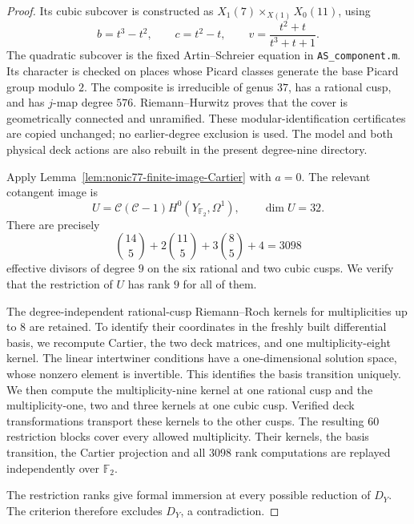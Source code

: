 \begin{proof}
Its cubic subcover is constructed as
$X_1(7)\times_{X(1)}X_0(11)$, using
\[
 b=t^3-t^2,\qquad c=t^2-t,\qquad
 v=\frac{t^2+t}{t^3+t+1}.
\]
The quadratic subcover is the fixed Artin--Schreier equation in
\texttt{AS\_component.m}. Its character is checked on places whose
Picard classes generate the base Picard group modulo $2$.
The composite is irreducible of genus $37$, has a rational cusp,
and has $j$-map degree $576$. Riemann--Hurwitz proves that the
cover is geometrically connected and unramified.
These modular-identification certificates are copied unchanged;
no earlier-degree exclusion is used. The model and both physical
deck actions are also rebuilt in the present degree-nine directory.

Apply Lemma~\ref{lem:nonic77-finite-image-Cartier} with $a=0$.
The relevant cotangent image is
\[
 U=\mathcal C(\mathcal C-1)H^0(Y_{\mathbb F_2},\Omega^1),
 \qquad \dim U=32.
\]
There are precisely
\[
 \binom{14}{5}+2\binom{11}{5}+3\binom85+4=3098
\]
effective divisors of degree $9$ on the six rational and two cubic
cusps. We verify that the restriction of $U$ has rank $9$ for all
of them.

The degree-independent rational-cusp Riemann--Roch kernels for
multiplicities up to $8$ are retained. To identify their coordinates
in the freshly built differential basis, we recompute Cartier,
the two deck matrices, and one multiplicity-eight kernel.
The linear intertwiner conditions have a one-dimensional solution
space, whose nonzero element is invertible. This identifies the
basis transition uniquely.
We then compute the multiplicity-nine kernel at one rational cusp
and the multiplicity-one, two and three kernels at one cubic cusp.
Verified deck transformations transport these kernels to the other
cusps. The resulting $60$ restriction blocks cover every allowed
multiplicity. Their kernels, the basis transition, the Cartier
projection and all $3098$ rank computations are replayed independently
over $\mathbb F_2$.

The restriction ranks give formal immersion at every possible
reduction of $D_Y$. The criterion therefore excludes $D_Y$, a
contradiction.
\end{proof}
